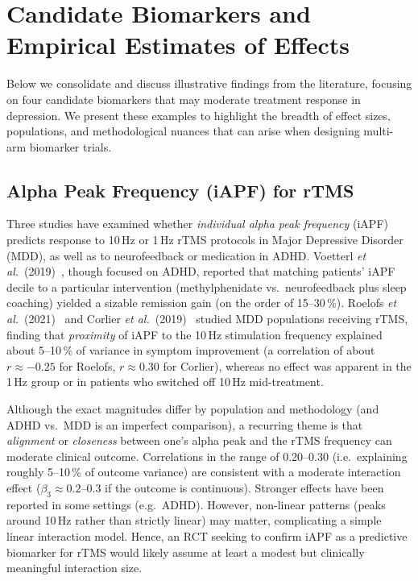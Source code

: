 \documentclass[11pt]{article}
\begin{document}
\pagebreak
\section{Candidate Biomarkers and Empirical Estimates of Effects}

Below we consolidate and discuss illustrative findings from the literature, focusing on four candidate biomarkers that may moderate treatment response in depression. We present these examples to highlight the breadth of effect sizes, populations, and methodological nuances that can arise when designing multi-arm biomarker trials.

\subsection{Alpha Peak Frequency (iAPF) for rTMS}

Three studies have examined whether \emph{individual alpha peak frequency} (iAPF) predicts response to 10\,Hz or 1\,Hz rTMS protocols in Major Depressive Disorder (MDD), as well as to neurofeedback or medication in ADHD. Voetterl \textit{et al.}~(2019)~\cite{voetterl2023}, though focused on ADHD, reported that matching patients' iAPF decile to a particular intervention (methylphenidate vs.\ neurofeedback plus sleep coaching) yielded a sizable remission gain (on the order of 15--30\,\%). Roelofs \textit{et al.}~(2021)~\cite{roelofs2021} and Corlier \textit{et al.}~(2019)~\cite{corlier2019} studied MDD populations receiving rTMS, finding that \emph{proximity} of iAPF to the 10\,Hz stimulation frequency explained about 5--10\,\% of variance in symptom improvement (a correlation of about $r\approx -0.25$ for Roelofs, $r\approx 0.30$ for Corlier), whereas no effect was apparent in the 1\,Hz group or in patients who switched off 10\,Hz mid-treatment.

Although the exact magnitudes differ by population and methodology (and ADHD vs.\ MDD is an imperfect comparison), a recurring theme is that \emph{alignment} or \emph{closeness} between one's alpha peak and the rTMS frequency can moderate clinical outcome. Correlations in the range of 0.20--0.30 (i.e.\ explaining roughly 5--10\,\% of outcome variance) are consistent with a moderate interaction effect ($\beta_{3}\approx 0.2$--0.3 if the outcome is continuous). Stronger effects have been reported in some settings (e.g.\ ADHD). However, non-linear patterns (peaks around 10\,Hz rather than strictly linear) may matter, complicating a simple linear interaction model. Hence, an RCT seeking to confirm iAPF as a predictive biomarker for rTMS would likely assume at least a modest but clinically meaningful interaction size.
\end{document}
